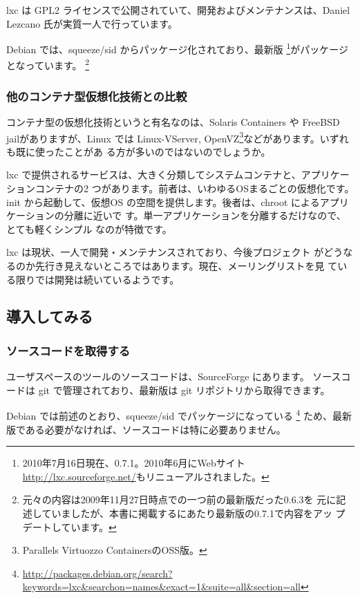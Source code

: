 \documentclass[mingoth,a4paper]{jsarticle}
\begin{document}
lxc は GPL2 ライセンスで公開されていて、開発およびメンテナンスは、Daniel
Lezcano 氏が実質一人で行っています。

Debian では、squeeze/sid からパッケージ化されており、最新版
\footnote{2010年7月16日現在、0.7.1。2010年6月にWebサイト\url{http://lxc.sourceforge.net/}もリニューアルされました。}がパッケージとなっています。
\footnote{元々の内容は2009年11月27日時点での一つ前の最新版だった0.6.3を
元に記述していましたが、本書に掲載するにあたり最新版の0.7.1で内容をアッ
プデートしています。}

\subsubsection{他のコンテナ型仮想化技術との比較}

コンテナ型の仮想化技術というと有名なのは、Solaris Containers や FreeBSD
jailがありますが、Linux では Linux-VServer, OpenVZ\footnote{Parallels
Virtuozzo ContainersのOSS版。}などがあります。いずれも既に使ったことがあ
る方が多いのではないのでしょうか。

lxc で提供されるサービスは、大きく分類してシステムコンテナと、アプリケーションコンテナの2
つがあります。前者は、いわゆるOSまるごとの仮想化です。init から起動して、仮想OS
の空間を提供します。後者は、chroot によるアプリケーションの分離に近いで
す。単一アプリケーションを分離するだけなので、とても軽くシンプル
なのが特徴です。

lxc は現状、一人で開発・メンテナンスされており、今後プロジェクト
がどうなるのか先行き見えないところではあります。現在、メーリングリストを見
ている限りでは開発は続いているようです。

\subsection{導入してみる}
\subsubsection{ソースコードを取得する}
ユーザスペースのツールのソースコードは、SourceForge にあります。
ソースコードは git で管理されており、最新版は git リポジトリから取得できます。


Debian では前述のとおり、squeeze/sid でパッケージになっている
\footnote{\url{http://packages.debian.org/search?keywords=lxc&searchon=names&exact=1&suite=all&section=all}}
ため、最新版である必要がなければ、ソースコードは特に必要ありません。
\end{document}
